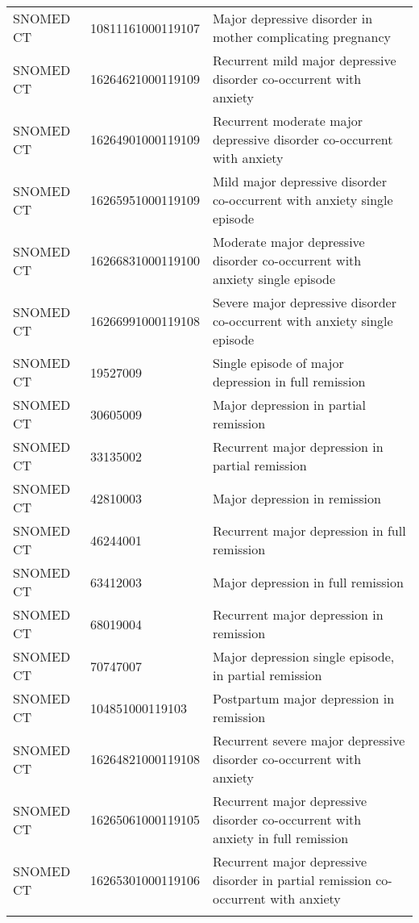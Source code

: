 \begin{longtable}{p{}p{}p{}}
  SNOMED CT & 10811161000119107 & Major depressive disorder in mother complicating pregnancy \\ 
  SNOMED CT & 16264621000119109 & Recurrent mild major depressive disorder co-occurrent with anxiety \\ 
  SNOMED CT & 16264901000119109 & Recurrent moderate major depressive disorder co-occurrent with anxiety \\ 
  SNOMED CT & 16265951000119109 & Mild major depressive disorder co-occurrent with anxiety single episode \\ 
  SNOMED CT & 16266831000119100 & Moderate major depressive disorder co-occurrent with anxiety single episode \\ 
  SNOMED CT & 16266991000119108 & Severe major depressive disorder co-occurrent with anxiety single episode \\ 
  SNOMED CT & 19527009 & Single episode of major depression in full remission \\ 
  SNOMED CT & 30605009 & Major depression in partial remission \\ 
  SNOMED CT & 33135002 & Recurrent major depression in partial remission \\ 
  SNOMED CT & 42810003 & Major depression in remission \\ 
  SNOMED CT & 46244001 & Recurrent major depression in full remission \\ 
  SNOMED CT & 63412003 & Major depression in full remission \\ 
  SNOMED CT & 68019004 & Recurrent major depression in remission \\ 
  SNOMED CT & 70747007 & Major depression single episode, in partial remission \\ 
  SNOMED CT & 104851000119103 & Postpartum major depression in remission \\ 
  SNOMED CT & 16264821000119108 & Recurrent severe major depressive disorder co-occurrent with anxiety \\ 
  SNOMED CT & 16265061000119105 & Recurrent major depressive disorder co-occurrent with anxiety in full remission \\ 
  SNOMED CT & 16265301000119106 & Recurrent major depressive disorder in partial remission co-occurrent with anxiety \\ 
  \hline
\label{tab:codes_major-depression}
\end{longtable}
